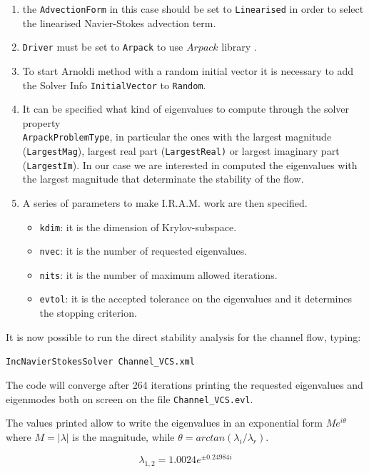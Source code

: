 \documentclass[a4paper,12pt]{article}
\begin{document}
\begin{enumerate}
\item the \texttt{AdvectionForm} in this case should be set to \texttt{Linearised} in order to select the linearised Navier-Stokes advection term. 
\item \texttt{Driver} must be set to \texttt{Arpack} to use $Arpack$ library .  
\item To start Arnoldi method with a random initial vector it is necessary to add the Solver Info \texttt{InitialVector} to \texttt{Random}.
\item  It can be specified what kind of eigenvalues to compute through the solver property\\ \texttt{ArpackProblemType},
 in particular the ones with the largest magnitude (\texttt{LargestMag}), largest real part (\texttt{LargestReal)} or largest imaginary part (\texttt{LargestIm}). In our case we are interested in computed the eigenvalues with the largest magnitude that determinate the stability of the flow.

\item A series of parameters to make I.R.A.M. work are then specified. 

\begin{itemize}
\item \texttt{kdim}: it is the dimension of Krylov-subspace.
\item \texttt{nvec}: it is the number of requested eigenvalues.
\item \texttt{nits}: it is the number of maximum allowed iterations.
\item \texttt{evtol}: it is the accepted tolerance on the eigenvalues and it determines the stopping criterion.
\end{itemize}

\end{enumerate}
It is now possible to run the direct stability analysis for the channel flow, typing:

\texttt{IncNavierStokesSolver Channel\_VCS.xml}

The code will converge after 264 iterations printing the requested eigenvalues and eigenmodes both on screen on the file \texttt{Channel\_VCS.evl}.

\vspace{0.5cm}
The values printed allow to write the eigenvalues in an exponential form $M e^{i\theta}$ where $M=|\lambda|$ is the magnitude, while $\theta= arctan (\lambda_i/\lambda_r)$.  

\begin{equation}
\lambda_{1,2}= 1.0024 e^{\pm 0.24984 i}
\end{equation}
\end{document}
